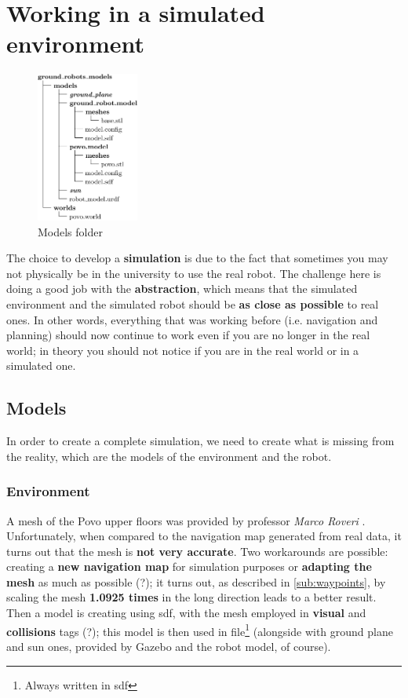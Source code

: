 \chapter{Working in a simulated environment}

\noindent\begin{figure}
    \includegraphics[width=0.3\textwidth]{images/models_folder}
    \caption{Models folder}
\end{figure}
The choice to develop a \textbf{simulation} is due to the fact that sometimes you may not physically be in the university to use the real robot. The challenge here is doing a good job with the \textbf{abstraction}, which means that the simulated environment and the simulated robot should be \textbf{as close as possible} to real ones. In other words, everything that was working before (i.e. navigation and planning) should now continue to work even if you are no longer in the real world; in theory you should not notice if you are in the real world or in a simulated one.

\section{Models}

In order to create a complete simulation, we need to create what is missing from the reality, which are the models of the environment and the robot.

\subsection{Environment}
\label{sub:map}

A mesh of the Povo upper floors was provided by professor \textit{Marco Roveri} \cite{roveri}. Unfortunately, when compared to the navigation map generated from real data, it turns out that the mesh is \textbf{not very accurate}. Two workarounds are possible: creating a \textbf{new navigation map} for simulation purposes or \textbf{adapting the mesh} as much as possible (?); it turns out, as described in \autoref{sub:waypoints}, by scaling the mesh \textbf{1.0925 times} in the long direction leads to a better result. %
Then a model is creating using \acrfull{sdf}, with the mesh employed in \textbf{visual} and \textbf{collisions} tags (?); this model is then used in  file\footnote{Always written in \acrshort{sdf}} (alongside with ground plane and sun ones, provided by Gazebo and the robot model, of course).

